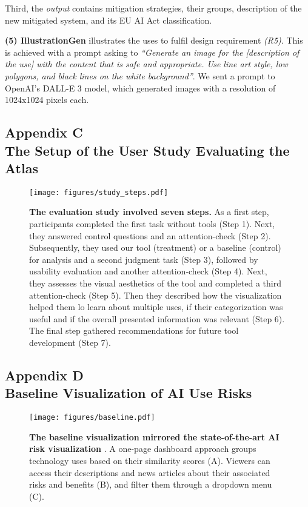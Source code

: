 Third, the \emph{output} contains mitigation strategies, their groups, description of the new mitigated system, and its EU AI Act classification. 

\smallskip
\textbf{(5) IllustrationGen} illustrates the uses to fulfil design requirement \emph{(R5)}. This is achieved with a prompt asking to \emph{``Generate an image for the [description of the use] with the content that is safe and appropriate. Use line art style, low polygons, and black lines on the white background''}. We sent a prompt to OpenAI's DALL-E 3 model, which generated images with a resolution of 1024x1024 pixels each.

\clearpage
\subsection{Appendix C \\The Setup of the User Study Evaluating the Atlas}

\begin{figure}[ht]
  \centering
\texttt{[image: figures/study\_steps.pdf]}
  \caption{\textbf{The evaluation study involved seven steps.} As a first step, participants completed the first task without tools (Step 1). Next, they answered control questions and an attention-check (Step 2). Subsequently, they used our tool (treatment) or a baseline (control) for analysis and a second judgment task (Step 3), followed by usability evaluation and another attention-check (Step 4). Next, they assesses the visual aesthetics of the tool and completed a third attention-check (Step 5). Then they described how the visualization helped them lo learn about multiple uses, if their categorization was useful and if the overall presented information was relevant (Step 6). The final step gathered recommendations for future tool development (Step 7). }
  \label{fig:survey_setup}
\end{figure}

\subsection{Appendix D \\Baseline Visualization of AI Use Risks}
\begin{figure}[h!]
  \centering
\texttt{[image: figures/baseline.pdf]}
  \caption{\textbf{The baseline visualization mirrored the state-of-the-art AI risk visualization} \cite{spatialDatabaseView}. A one-page dashboard approach groups technology uses based on their similarity scores (A). Viewers can access their descriptions and news articles about their associated risks and benefits (B), and filter them through a dropdown menu (C).}
  \label{fig:baseline}
\end{figure}

